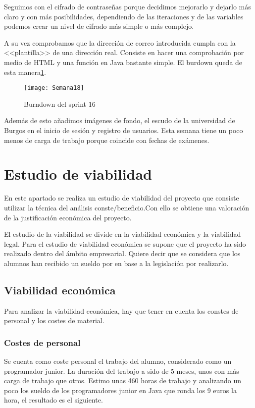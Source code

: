 Seguimos con el cifrado de contraseñas porque decidimos mejorarlo y dejarlo más claro y con más posibilidades, dependiendo de las iteraciones y de las variables podemos crear un nivel de cifrado más simple o más complejo. 

A su vez comprobamos que la dirección de correo introducida cumpla con la <<plantilla>> de una dirección real. Consiste en hacer una comprobación por medio de HTML y una función en Java bastante simple. El burdown queda de esta manera\ref{fig:A.15}.

\begin{figure}[h]
\centering
\texttt{[image: Semana18]}
\caption{Burndown del sprint 16}
\label{fig:A.15}
\end{figure}

Además de esto añadimos imágenes de fondo, el escudo de la universidad de Burgos en el inicio de sesión y registro de usuarios. Esta semana tiene un poco menos de carga de trabajo porque coincide con fechas de exámenes.


\section{Estudio de viabilidad}

En este apartado se realiza un estudio de viabilidad del proyecto que consiste utilizar la
técnica del análisis conste/beneficio.Con ello se obtiene una valoración de la justificación económica del proyecto.

El estudio de la viabilidad se divide en la
viabilidad económica y la viabilidad legal.
Para el estudio de viabilidad económica se supone que el proyecto ha sido realizado
dentro del ámbito empresarial. Quiere decir que se considera que los alumnos han recibido un sueldo por en base a la legislación por realizarlo.


\subsection{Viabilidad económica}

Para analizar la viabilidad económica, hay que tener en cuenta los constes de personal y los costes de material.

\subsubsection{Costes de personal}

Se cuenta como coste personal el trabajo del alumno, considerado como un programador junior. La duración del trabajo a sido de 5 meses, unos con más carga de trabajo que otros. Estimo unas 460 horas de trabajo y analizando un poco los sueldo de los programadores junior en Java que ronda los 9 euros la hora, el resultado es el siguiente.

